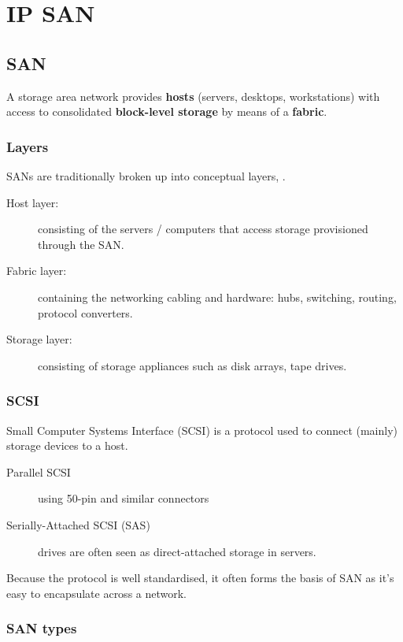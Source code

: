 \chapter{IP SAN}
\label{ch:ip-san}

\section{SAN}
\label{sec:san}

A storage area network provides \textbf{hosts} (servers, desktops,
workstations) with access to consolidated \textbf{block-level storage}
by means of a \textbf{fabric}.

\subsection{Layers}
\label{sec:ip-san-layers}

SANs are traditionally broken up into conceptual layers, .

\begin{description}
\item[Host layer:]
consisting of the servers / computers that access storage provisioned
through the SAN.
\item[Fabric layer:]
containing the networking cabling and hardware: hubs, switching,
routing, protocol converters.
\item[Storage layer:]
consisting of storage appliances such as disk arrays, tape drives.
\end{description}

\subsection{SCSI}
\label{sec:scsi}

Small Computer Systems Interface (SCSI) is a protocol used to connect
(mainly) storage devices to a host.

\begin{description}
\item[Parallel SCSI]
using 50-pin and similar connectors
\item[Serially-Attached SCSI (SAS)]
drives are often seen as direct-attached storage in servers.
\end{description}

Because the protocol is well standardised, it often forms the basis of
SAN as it's easy to encapsulate across a network.

\subsection{SAN types}
\label{sec:san-types}

